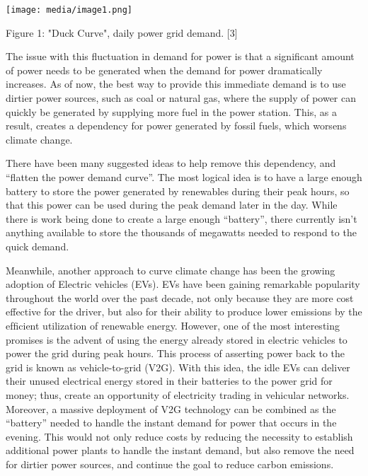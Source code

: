 \documentclass[
]{article}
\begin{document}
\texttt{[image: media/image1.png]}

Figure 1: "Duck Curve", daily power grid demand. {[}3{]}

The issue with this fluctuation in demand for power is that a
significant amount of power needs to be generated when the demand for
power dramatically increases. As of now, the best way to provide this
immediate demand is to use dirtier power sources, such as coal or
natural gas, where the supply of power can quickly be generated by
supplying more fuel in the power station. This, as a result, creates a
dependency for power generated by fossil fuels, which worsens climate
change.

There have been many suggested ideas to help remove this dependency, and
``flatten the power demand curve''. The most logical idea is to have a
large enough battery to store the power generated by renewables during
their peak hours, so that this power can be used during the peak demand
later in the day. While there is work being done to create a large
enough ``battery'', there currently isn't anything available to store
the thousands of megawatts needed to respond to the quick demand.

Meanwhile, another approach to curve climate change has been the growing
adoption of Electric vehicles (EVs). EVs have been gaining remarkable
popularity throughout the world over the past decade, not only because
they are more cost effective for the driver, but also for their ability
to produce lower emissions by the efﬁcient utilization of renewable
energy. However, one of the most interesting promises is the advent of
using the energy already stored in electric vehicles to power the grid
during peak hours. This process of asserting power back to the grid is
known as vehicle-to-grid (V2G). With this idea, the idle EVs can deliver
their unused electrical energy stored in their batteries to the power
grid for money; thus, create an opportunity of electricity trading in
vehicular networks. Moreover, a massive deployment of V2G technology can
be combined as the ``battery'' needed to handle the instant demand for
power that occurs in the evening. This would not only reduce costs by
reducing the necessity to establish additional power plants to handle
the instant demand, but also remove the need for dirtier power sources,
and continue the goal to reduce carbon emissions.
\end{document}
